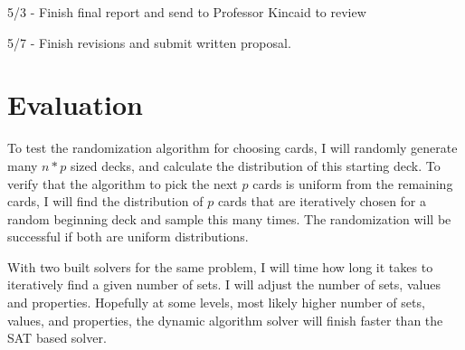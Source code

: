 \documentclass[12pt]{article}%
\begin{document}
	5/3 - Finish final report and send to Professor Kincaid to review
	
	5/7 - Finish revisions and submit written proposal. 
	
	
	
\section*{Evaluation}
\hspace{5mm} To test the randomization algorithm for choosing cards, I will randomly generate many $n*p$ sized decks, and calculate the distribution of this starting deck. To verify that the algorithm to pick the next $p$ cards is uniform from the remaining cards, I will find the distribution of $p$ cards that are iteratively chosen for a random beginning deck and sample this many times. The randomization will be successful if both are uniform distributions.

With two built solvers for the same problem, I will time how long it takes to iteratively find a given number of sets. I will adjust the number of sets, values and properties. Hopefully at some levels, most likely higher number of sets, values, and properties, the dynamic algorithm solver will finish faster than the SAT based solver. 
 




{}

\end{document}
